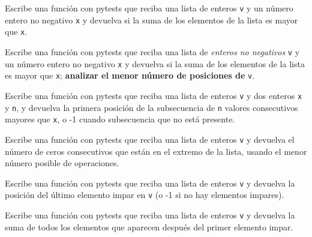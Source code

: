 \begin{ejercicio}Escribe una función con pytests  que reciba una lista de enteros
  \verb#v# y un n\'umero entero no negativo \verb#x# y devuelva si
  la suma de los elementos de la lista es mayor que \verb#x#.
\end{ejercicio}
\begin{ejercicio}Escribe una función con pytests  que reciba una lista de \emph
  {enteros no negativos} \verb#v# y un n\'umero entero no negativo
  \verb#x# y devuelva si la suma de los elementos de la lista es
  mayor que \verb#x#; \textbf{analizar el menor n\'umero de posiciones de} \verb#v#.
\end{ejercicio}
\begin{ejercicio}Escribe una función con pytests  que reciba una lista de enteros
  \verb#v# y dos enteros \verb#x# y \verb#n#, y devuelva la primera
  posici\'on de la subsecuencia de \verb#n# valores consecutivos
  mayores que \verb#x#, o -1 cuando subsecuencia que no est\'a
  presente.
\end{ejercicio}
\begin{ejercicio}Escribe una función con pytests  que reciba una lista de enteros
  \verb#v# y devuelva el n\'umero de ceros consecutivos que est\'an en
  el extremo de la lista, usando el menor n\'umero posible de
  operaciones.
\end{ejercicio}
\begin{ejercicio}Escribe una función con pytests  que reciba una lista de enteros
  \verb#v# y devuelva la posici\'on del \'ultimo elemento impar en
  \verb#v# (o -1 si no hay elementos impares).
\end{ejercicio}
\begin{ejercicio}Escribe una función con pytests  que reciba una lista de enteros
  \verb#v# y devuelva la suma de todos los elementos que aparecen
  despu\'es del primer elemento impar.
\end{ejercicio}

